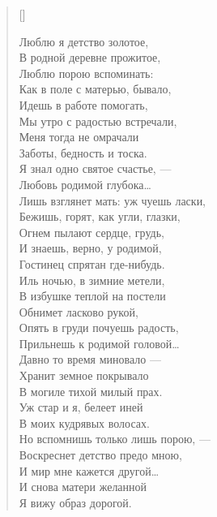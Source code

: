 \settowidth{\versewidth}{\vinВ родной деревне прожитое,}
\begin{verse}[\versewidth]
\begin{altverse}
Люблю я детство золотое,\\
 В родной деревне прожитое,\\
Люблю порою вспоминать:\\
Как в поле с матерью, бывало,\\
Идешь в работе помогать,\\
Мы утро с радостью встречали,\\
Меня тогда не омрачали\\
Заботы, бедность и тоска.\\
Я знал одно святое счастье, ---\\
Любовь родимой глубока\ldots\\
Лишь взглянет мать: уж чуешь ласки,\\
Бежишь, горят, как угли, глазки,\\
Огнем пылают сердце, грудь,\\
И знаешь, верно, у родимой, \\
Гостинец спрятан где-нибудь.\\
Иль ночью, в зимние метели,\\
В избушке теплой на постели\\
Обнимет ласково рукой,\\
Опять в груди почуешь радость, \\
Прильнешь к родимой головой\ldots\\
Давно то время миновало ---\\
Хранит земное покрывало\\
В могиле тихой милый прах.\\
Уж стар и я, белеет иней\\
В моих кудрявых волосах.\\
Но вспомнишь только лишь порою, ---\\
Воскреснет детство предо мною,\\
И мир мне кажется другой\ldots\\
И снова матери желанной\\
Я вижу образ дорогой.
\end{altverse}
\end{verse}

